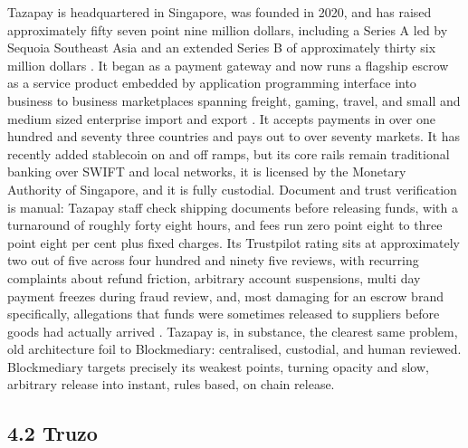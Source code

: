 \documentclass[12pt, a4paper]{article}
\begin{document}
Tazapay is headquartered in Singapore, was founded in 2020, and has raised approximately
fifty seven point nine million dollars, including a Series A led by Sequoia Southeast Asia
and an extended Series B of approximately thirty six million dollars
\citep{tazapayseriesa2023, tazapayseriesb2026}. It began as a payment gateway and now runs
a flagship escrow as a service product embedded by application programming interface into
business to business marketplaces spanning freight, gaming, travel, and small and medium
sized enterprise import and export \citep{tazapayeaas2021}. It accepts payments in over
one hundred and seventy three countries and pays out to over seventy markets. It has
recently added stablecoin on and off ramps, but its core rails remain traditional banking
over SWIFT and local networks, it is licensed by the Monetary Authority of Singapore, and
it is fully custodial. Document and trust verification is manual: Tazapay staff check
shipping documents before releasing funds, with a turnaround of roughly forty eight hours,
and fees run zero point eight to three point eight per cent plus fixed charges. Its
Trustpilot rating sits at approximately two out of five across four hundred and ninety
five reviews, with recurring complaints about refund friction, arbitrary account
suspensions, multi day payment freezes during fraud review, and, most damaging for an
escrow brand specifically, allegations that funds were sometimes released to suppliers
before goods had actually arrived \citep{tazapaytrustpilot}. Tazapay is, in substance, the
clearest same problem, old architecture foil to Blockmediary: centralised, custodial, and
human reviewed. Blockmediary targets precisely its weakest points, turning opacity and
slow, arbitrary release into instant, rules based, on chain release.

\subsection*{4.2 Truzo}
\end{document}
